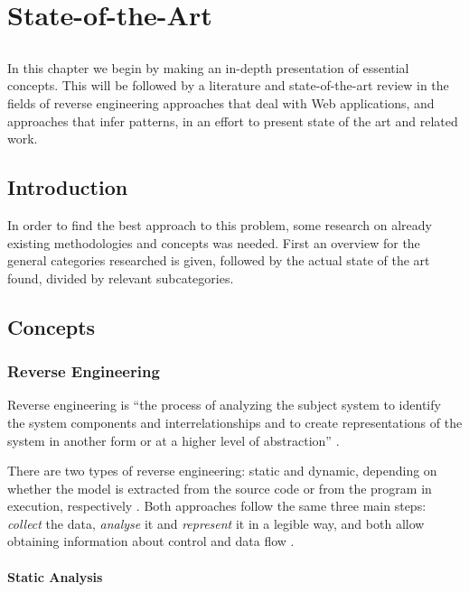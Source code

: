 \chapter{State-of-the-Art} \label{chap:sota}

\section*{}

In this chapter we begin by making an in-depth presentation of essential concepts. This will be followed by a literature and state-of-the-art review in the fields of reverse engineering approaches that deal with Web applications, and approaches that infer patterns, in an effort to present state of the art and related work.

\section{Introduction}
In order to find the best approach to this problem, some research on already existing methodologies and concepts was needed. First an overview for the general categories researched is given, followed by the actual state of the art found, divided by relevant subcategories. 

\section{Concepts}

\subsection{Reverse Engineering}\label{sec:reverseengineering}

Reverse engineering is “the process of analyzing the subject system to identify the system components and interrelationships and to create representations of the system in another form or at a higher level of abstraction” \cite{chikofsky1990reverse}.

There are two types of reverse engineering: static and dynamic, depending on whether the model is extracted from the source code or from the program in execution, respectively \cite{systa1999dynamic}. Both approaches follow the same three main steps: \textit{collect} the data, \textit{analyse} it and \textit{represent} it in a legible way, and both allow obtaining information about control and data flow \cite{pacione2003comparative}.

\subsubsection{Static Analysis}

